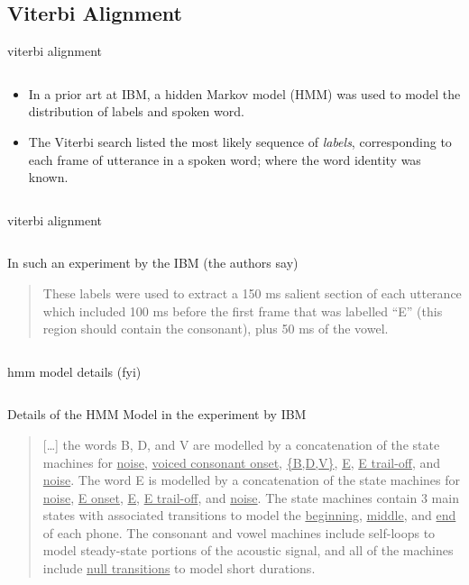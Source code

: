 \documentclass[aspectratio=169,xcolor={dvipsnames,svgnames}]{beamer}
\begin{document}
\subsection{Viterbi Alignment}
\label{sec:orga3a6701}
\begin{frame}[label={sec:viterbi-alignment}]{viterbi alignment}
\begin{columns}
\begin{column}{.5\columnwidth}
\begin{itemize}
\item In a prior art at IBM, a hidden Markov model (HMM)
was used to model the distribution of labels and
spoken word.
\item The Viterbi search listed the most likely sequence of
\emph{labels}, corresponding to each frame of utterance in
a spoken word; where the word identity was known.
\end{itemize}
\end{column}
\end{columns}
\end{frame}

\begin{frame}[label={sec:org6af742b}]{viterbi alignment}
\begin{columns}
\begin{column}{.5\columnwidth}
In such an experiment by the IBM (the authors say)

\begin{quote}
These labels were used to extract a 150 ms salient
section of each utterance which included 100 ms before
the first frame that was labelled ``E'' (this region
should contain the consonant), plus 50 ms of the vowel.
\end{quote}
\end{column}
\end{columns}
\end{frame}

\begin{frame}[label={sec:org5072daf}]{hmm model details (fyi)}
\begin{columns}
\begin{column}{.7\columnwidth}
Details of the HMM Model in the experiment by IBM
\begin{quote}
[\ldots] the words \alert{B}, \alert{D}, and \alert{V} are modelled by a
concatenation of the state machines for \uline{noise},
\uline{voiced consonant onset}, \uline{\{B,D,V\}}, \uline{E}, \uline{E
trail-off}, and \uline{noise}. The word \alert{E} is modelled by a
concatenation of the state machines for \uline{noise}, \uline{E
onset}, \uline{E}, \uline{E trail-off}, and \uline{noise}. The state
machines contain 3 main states with associated
transitions to model the \uline{beginning}, \uline{middle}, and
\uline{end} of each phone. The consonant and vowel machines
include \alert{self-loops} to model steady-state portions of
the acoustic signal, and all of the machines include
\uline{null transitions} to model short durations.
\end{quote}
\end{column}
\end{columns}
\end{frame}
\end{document}

